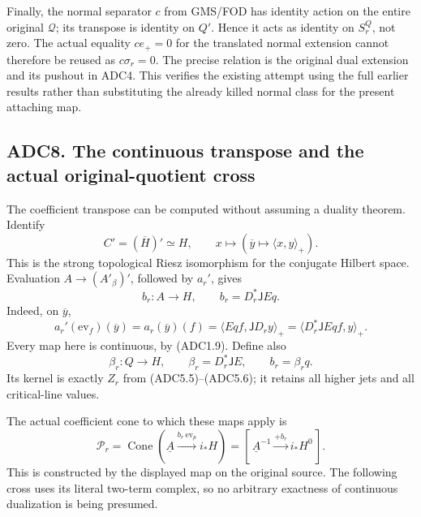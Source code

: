 Finally, the normal separator \(c\) from GMS/FOD has identity action on
the entire original \(\mathcal Q\); its transpose is identity on \(Q'\).
Hence it acts as identity on \(S_r^Q\), not zero. The actual equality
\(ce_+=0\) for the translated normal extension cannot therefore be
reused as \(c\sigma_r=0\). The precise relation is the original dual
extension and its pushout in ADC4. This verifies the existing attempt
using the full earlier results rather than substituting the already
killed normal class for the present attaching map.

\subsection{ADC8. The continuous transpose and the actual
original-quotient
cross}\label{adc8.-the-continuous-transpose-and-the-actual-original-quotient-cross}

The coefficient transpose can be computed without assuming a duality
theorem. Identify \[
C'=(\overline H)'\simeq H,\qquad
x\longmapsto(\overline y\longmapsto\langle x,y\rangle_+).
\tag{ADC8.1}
\] This is the strong topological Riesz isomorphism for the conjugate
Hilbert space. Evaluation \(A\to(A'_\beta)'\), followed by \(a_r'\),
gives \[
b_r:A\longrightarrow H,\qquad
b_r=D_r^*\mathsf J E q.
\tag{ADC8.2}
\] Indeed, on \(\overline y\), \[
a_r'(\mathrm{ev}_f)(\overline y)
=a_r(\overline y)(f)
=\langle E qf,\mathsf JD_ry\rangle_+
=\langle D_r^*\mathsf JE qf,y\rangle_+.
\tag{ADC8.3}
\] Every map here is continuous, by (ADC1.9). Define also \[
\beta_r:Q\to H,\qquad \beta_r=D_r^*\mathsf JE,\qquad
b_r=\beta_rq.
\tag{ADC8.4}
\] Its kernel is exactly \(Z_r\) from (ADC5.5)--(ADC5.6); it retains all
higher jets and all critical-line values.

The actual coefficient cone to which these maps apply is \[
\mathscr P_r=\operatorname{Cone}
(\underline A\xrightarrow{b_r\,\mathrm{ev}_p}i_*H)
=[\,\underline A^{-1}\xrightarrow{+b_r}i_*H^0\,].
\tag{ADC8.5}
\] This is constructed by the displayed map on the original source. The
following cross uses its literal two-term complex, so no arbitrary
exactness of continuous dualization is being presumed.

